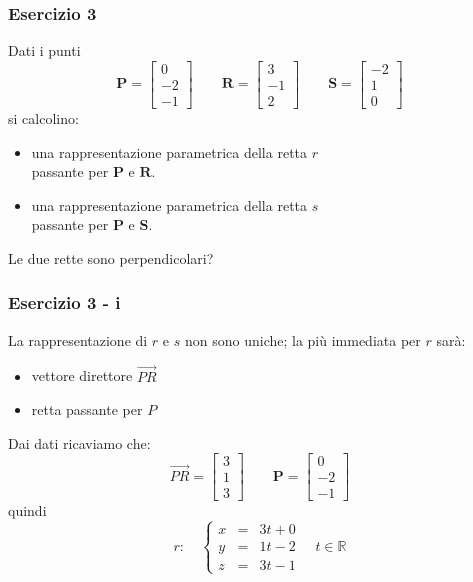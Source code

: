 \documentclass{beamer}
\begin{document}
\begin{frame}
\frametitle{Esercizio 3}
Dati i punti
$$
\mathbf{P}=\left[
\begin{array}{c}
0\\
-2\\
-1
\end{array}
\right]
\qquad
\mathbf{R}=\left[
\begin{array}{c}
3\\
-1\\
2
\end{array}
\right] \qquad
\mathbf{S}=\left[
\begin{array}{c}
-2\\
1\\
0
\end{array}
\right] 
$$
si calcolino:
    \begin{itemize}
    \item una rappresentazione parametrica della retta $r$ \\ passante per $\mathbf{P}$ e $\mathbf{R}$.
    \item una rappresentazione parametrica della retta $s$ \\ passante per $\mathbf{P}$ e $\mathbf{S}$.
    \end{itemize}
    
Le due rette sono perpendicolari?
\end{frame}

\begin{frame}
\frametitle{Esercizio 3 - i}

La rappresentazione di $r$ e $s$ non sono uniche; la pi\`u immediata per $r$ sar\`a:
\begin{itemize}
        \item vettore direttore $\overrightarrow{PR}$
        \item retta passante per $P$
\end{itemize}
Dai dati ricaviamo che:
$$
\overrightarrow{PR} = \left[
\begin{array}{c}
3\\
1\\
3
\end{array}
\right]
\qquad
\mathbf P = \left[
\begin{array}{c}
0\\
-2\\
-1
\end{array}
\right]
$$
quindi 
$$r: \quad \left\{
\begin{array}{rcl}
x&=&3t+0\\
y&=&1t-2\\
z&=&3t-1
\end{array}
\right. \quad t\in \mathbb{R}
$$
\end{frame}
\end{document}
